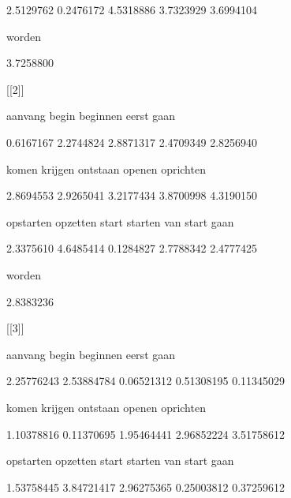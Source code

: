      2.5129762      0.2476172      4.5318886      3.7323929      3.6994104 



        worden 



     3.7258800 



[[2]]



       aanvang          begin       beginnen          eerst           gaan 



     0.6167167      2.2744824      2.8871317      2.4709349      2.8256940 



         komen        krijgen       ontstaan         openen      oprichten 



     2.8694553      2.9265041      3.2177434      3.8700998      4.3190150 



     opstarten       opzetten          start        starten van start gaan 



     2.3375610      4.6485414      0.1284827      2.7788342      2.4777425 



        worden 



     2.8383236 



[[3]]



       aanvang          begin       beginnen          eerst           gaan 



    2.25776243     2.53884784     0.06521312     0.51308195     0.11345029 



         komen        krijgen       ontstaan         openen      oprichten 



    1.10378816     0.11370695     1.95464441     2.96852224     3.51758612 



     opstarten       opzetten          start        starten van start gaan 



    1.53758445     3.84721417     2.96275365     0.25003812     0.37259612 



